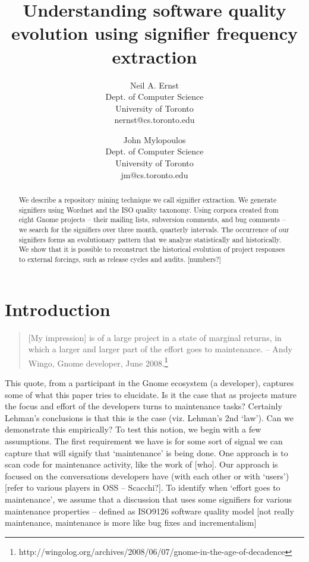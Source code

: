 \documentclass[conference, compsoc]{IEEEtran}
\begin{document}

 
\title{Understanding software quality evolution using signifier frequency extraction}
\author{
Neil A. Ernst\\Dept. of Computer Science\\University of Toronto\\nernst@cs.toronto.edu \and
John Mylopoulos\\Dept. of Computer Science\\University of Toronto\\jm@cs.toronto.edu }

\maketitle

\begin{abstract}
We describe a repository mining technique we call signifier extraction. We generate signifiers using Wordnet and the ISO quality taxonomy. Using corpora created from eight Gnome projects -- their mailing lists, subversion comments, and bug comments -- we search for the signifiers over three month, quarterly intervals. The occurrence of our signifiers forms an evolutionary pattern that we analyze statistically and historically. We show that it is possible to reconstruct the historical evolution of project responses to external forcings, such as release cycles and audits. [numbers?]
\end{abstract}

\section{Introduction}\label{sect:introduction}%
\begin{quote}[My impression] is of a large project in a state of marginal returns, in which a larger and larger part of the effort goes to maintenance. -- Andy Wingo, Gnome developer, June 2008.\footnote{http://wingolog.org/archives/2008/06/07/gnome-in-the-age-of-decadence}\end{quote}
	This quote, from a participant in the Gnome ecosystem (a developer), captures some of what this paper tries to elucidate. Is it the case that as projects mature the focus and effort of the developers turns to maintenance tasks? \cite{swanson} Certainly Lehman's conclusions \cite{lehman} is that this is the case (viz. Lehman's 2nd `law'). Can we demonstrate this empirically? To test this notion, we begin with a few assumptions. The first requirement we have is for some sort of signal we can capture that will signify that `maintenance' is being done. One approach is to scan code for maintenance activity, like the work of [who]. Our approach is focused on the conversations developers have (with each other or with `users') [refer to various players in OSS -- Scacchi?]. To identify when `effort goes to maintenance', we assume that a discussion that uses some signifiers for various maintenance properties -- defined as ISO9126 software quality model [not really maintenance, maintenance is more like bug fixes and incrementalism]
	
\end{document}
